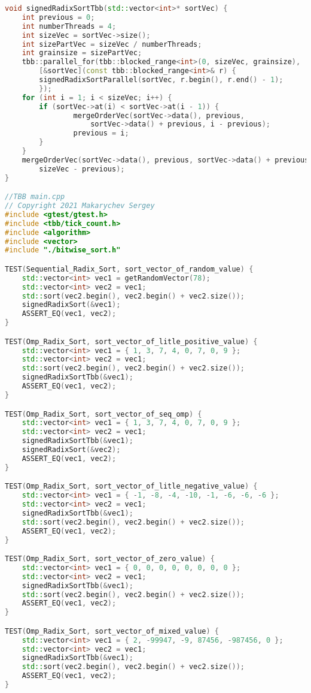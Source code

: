 \documentclass{report}
\begin{document}
\begin{lstlisting}[language=C++]
void signedRadixSortTbb(std::vector<int>* sortVec) {
    int previous = 0;
    int numberThreads = 4;
    int sizeVec = sortVec->size();
    int sizePartVec = sizeVec / numberThreads;
    int grainsize = sizePartVec;
    tbb::parallel_for(tbb::blocked_range<int>(0, sizeVec, grainsize),
        [&sortVec](const tbb::blocked_range<int>& r) {
        signedRadixSortParallel(sortVec, r.begin(), r.end() - 1);
        });
    for (int i = 1; i < sizeVec; i++) {
        if (sortVec->at(i) < sortVec->at(i - 1)) {
                mergeOrderVec(sortVec->data(), previous,
                    sortVec->data() + previous, i - previous);
                previous = i;
        }
    }
    mergeOrderVec(sortVec->data(), previous, sortVec->data() + previous,
        sizeVec - previous);
}

//TBB main.cpp
// Copyright 2021 Makarychev Sergey
#include <gtest/gtest.h>
#include <tbb/tick_count.h>
#include <algorithm>
#include <vector>
#include "./bitwise_sort.h"

TEST(Sequential_Radix_Sort, sort_vector_of_random_value) {
    std::vector<int> vec1 = getRandomVector(78);
    std::vector<int> vec2 = vec1;
    std::sort(vec2.begin(), vec2.begin() + vec2.size());
    signedRadixSort(&vec1);
    ASSERT_EQ(vec1, vec2);
}

TEST(Omp_Radix_Sort, sort_vector_of_litle_positive_value) {
    std::vector<int> vec1 = { 1, 3, 7, 4, 0, 7, 0, 9 };
    std::vector<int> vec2 = vec1;
    std::sort(vec2.begin(), vec2.begin() + vec2.size());
    signedRadixSortTbb(&vec1);
    ASSERT_EQ(vec1, vec2);
}

TEST(Omp_Radix_Sort, sort_vector_of_seq_omp) {
    std::vector<int> vec1 = { 1, 3, 7, 4, 0, 7, 0, 9 };
    std::vector<int> vec2 = vec1;
    signedRadixSortTbb(&vec1);
    signedRadixSort(&vec2);
    ASSERT_EQ(vec1, vec2);
}

TEST(Omp_Radix_Sort, sort_vector_of_litle_negative_value) {
    std::vector<int> vec1 = { -1, -8, -4, -10, -1, -6, -6, -6 };
    std::vector<int> vec2 = vec1;
    signedRadixSortTbb(&vec1);
    std::sort(vec2.begin(), vec2.begin() + vec2.size());
    ASSERT_EQ(vec1, vec2);
}

TEST(Omp_Radix_Sort, sort_vector_of_zero_value) {
    std::vector<int> vec1 = { 0, 0, 0, 0, 0, 0, 0, 0 };
    std::vector<int> vec2 = vec1;
    signedRadixSortTbb(&vec1);
    std::sort(vec2.begin(), vec2.begin() + vec2.size());
    ASSERT_EQ(vec1, vec2);
}

TEST(Omp_Radix_Sort, sort_vector_of_mixed_value) {
    std::vector<int> vec1 = { 2, -99947, -9, 87456, -987456, 0 };
    std::vector<int> vec2 = vec1;
    signedRadixSortTbb(&vec1);
    std::sort(vec2.begin(), vec2.begin() + vec2.size());
    ASSERT_EQ(vec1, vec2);
}


\end{lstlisting}
\end{document}
